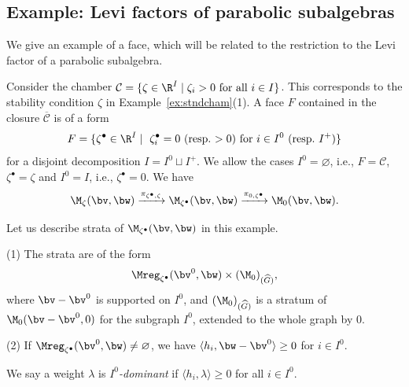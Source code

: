 \subsection{Example: Levi factors of parabolic
  subalgebras}\label{subsec:Levi}

We give an example of a face, which will be related to the restriction
to the Levi factor of a parabolic subalgebra.

Consider the chamber $\mathcal C = \{ \zeta\in \R^I \mid
\text{$\zeta_i > 0$ for all $i\in I$}\}$. This corresponds to the
stability condition $\zeta$ in Example~\ref{ex:stndcham}(1). A face
$F$ contained in the closure $\overline{\mathcal C}$ is of a form
\begin{equation*}
    F = \{ \zeta^\bullet\in \R^I \mid \text{
     $\zeta_i^\bullet = 0$ (resp.\ $> 0$) for
    $i \in I^0$ (resp.\ $I^+$)}\}
\end{equation*}
for a disjoint decomposition $I = I^0 \sqcup I^+$. We allow the cases
$I^0 = \varnothing$, i.e., $F = \mathcal C$, $\zeta^\bullet = \zeta$ and
$I^0=I$, i.e., $\zeta^\bullet = 0$.
%
We have
\begin{equation*}
   \M_\zeta(\bv,\bw)\xrightarrow{\pi_{\zeta^\bullet,\zeta}}
   \M_{\zeta^\bullet}(\bv,\bw)\xrightarrow{\pi_{0,\zeta^\bullet}}
   \M_0(\bv,\bw).
\end{equation*}

Let us describe strata of $\M_{\zeta^\bullet}(\bv,\bw)$ in this
example.

\begin{Proposition}\label{prop:Levi}
  \textup{(1)} The strata are of the form
\begin{equation}\label{eq:Levistratum}
   \Mreg_{\zeta^\bullet}(\bv^0,\bw) \times (\M_0)_{(\widehat G)},
\end{equation}
where $\bv - \bv^0$ is supported on $I^0$, and
%
$(\M_0)_{(\widehat G)}$ is a stratum of $\M_0(\bv-\bv^0,0)$ for
the subgraph $I^0$, extended to the whole graph by $0$.

\textup{(2)} If $\Mreg_{\zeta^\bullet}(\bv^0,\bw)\neq\varnothing$, we
have
\(
   \langle h_i, \bw - \bv^0\rangle \ge 0
\)
for $i\in I^0$.
\end{Proposition}

We say a weight $\lambda$ is {\it $I^0$-dominant\/} if
\(
\langle h_i, \lambda\rangle \ge 0
\)
for all $i\in I^0$.

